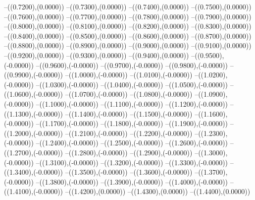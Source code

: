 {	--({\sx*(0.7200)},{\sy*(0.0000)})
	--({\sx*(0.7300)},{\sy*(0.0000)})
	--({\sx*(0.7400)},{\sy*(0.0000)})
	--({\sx*(0.7500)},{\sy*(0.0000)})
	--({\sx*(0.7600)},{\sy*(0.0000)})
	--({\sx*(0.7700)},{\sy*(0.0000)})
	--({\sx*(0.7800)},{\sy*(0.0000)})
	--({\sx*(0.7900)},{\sy*(0.0000)})
	--({\sx*(0.8000)},{\sy*(0.0000)})
	--({\sx*(0.8100)},{\sy*(0.0000)})
	--({\sx*(0.8200)},{\sy*(0.0000)})
	--({\sx*(0.8300)},{\sy*(0.0000)})
	--({\sx*(0.8400)},{\sy*(0.0000)})
	--({\sx*(0.8500)},{\sy*(0.0000)})
	--({\sx*(0.8600)},{\sy*(0.0000)})
	--({\sx*(0.8700)},{\sy*(0.0000)})
	--({\sx*(0.8800)},{\sy*(0.0000)})
	--({\sx*(0.8900)},{\sy*(0.0000)})
	--({\sx*(0.9000)},{\sy*(0.0000)})
	--({\sx*(0.9100)},{\sy*(0.0000)})
	--({\sx*(0.9200)},{\sy*(0.0000)})
	--({\sx*(0.9300)},{\sy*(0.0000)})
	--({\sx*(0.9400)},{\sy*(0.0000)})
	--({\sx*(0.9500)},{\sy*(-0.0000)})
	--({\sx*(0.9600)},{\sy*(-0.0000)})
	--({\sx*(0.9700)},{\sy*(-0.0000)})
	--({\sx*(0.9800)},{\sy*(-0.0000)})
	--({\sx*(0.9900)},{\sy*(-0.0000)})
	--({\sx*(1.0000)},{\sy*(-0.0000)})
	--({\sx*(1.0100)},{\sy*(-0.0000)})
	--({\sx*(1.0200)},{\sy*(-0.0000)})
	--({\sx*(1.0300)},{\sy*(-0.0000)})
	--({\sx*(1.0400)},{\sy*(-0.0000)})
	--({\sx*(1.0500)},{\sy*(-0.0000)})
	--({\sx*(1.0600)},{\sy*(-0.0000)})
	--({\sx*(1.0700)},{\sy*(-0.0000)})
	--({\sx*(1.0800)},{\sy*(-0.0000)})
	--({\sx*(1.0900)},{\sy*(-0.0000)})
	--({\sx*(1.1000)},{\sy*(-0.0000)})
	--({\sx*(1.1100)},{\sy*(-0.0000)})
	--({\sx*(1.1200)},{\sy*(-0.0000)})
	--({\sx*(1.1300)},{\sy*(-0.0000)})
	--({\sx*(1.1400)},{\sy*(-0.0000)})
	--({\sx*(1.1500)},{\sy*(-0.0000)})
	--({\sx*(1.1600)},{\sy*(-0.0000)})
	--({\sx*(1.1700)},{\sy*(-0.0000)})
	--({\sx*(1.1800)},{\sy*(-0.0000)})
	--({\sx*(1.1900)},{\sy*(-0.0000)})
	--({\sx*(1.2000)},{\sy*(-0.0000)})
	--({\sx*(1.2100)},{\sy*(-0.0000)})
	--({\sx*(1.2200)},{\sy*(-0.0000)})
	--({\sx*(1.2300)},{\sy*(-0.0000)})
	--({\sx*(1.2400)},{\sy*(-0.0000)})
	--({\sx*(1.2500)},{\sy*(-0.0000)})
	--({\sx*(1.2600)},{\sy*(-0.0000)})
	--({\sx*(1.2700)},{\sy*(-0.0000)})
	--({\sx*(1.2800)},{\sy*(-0.0000)})
	--({\sx*(1.2900)},{\sy*(-0.0000)})
	--({\sx*(1.3000)},{\sy*(-0.0000)})
	--({\sx*(1.3100)},{\sy*(-0.0000)})
	--({\sx*(1.3200)},{\sy*(-0.0000)})
	--({\sx*(1.3300)},{\sy*(-0.0000)})
	--({\sx*(1.3400)},{\sy*(-0.0000)})
	--({\sx*(1.3500)},{\sy*(-0.0000)})
	--({\sx*(1.3600)},{\sy*(-0.0000)})
	--({\sx*(1.3700)},{\sy*(-0.0000)})
	--({\sx*(1.3800)},{\sy*(-0.0000)})
	--({\sx*(1.3900)},{\sy*(-0.0000)})
	--({\sx*(1.4000)},{\sy*(-0.0000)})
	--({\sx*(1.4100)},{\sy*(-0.0000)})
	--({\sx*(1.4200)},{\sy*(0.0000)})
	--({\sx*(1.4300)},{\sy*(0.0000)})
	--({\sx*(1.4400)},{\sy*(0.0000)})
}
